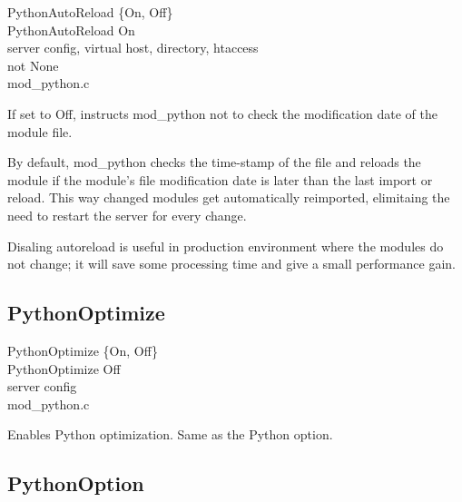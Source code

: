 PythonAutoReload \{On, Off\} \\
PythonAutoReload On\\
server config, virtual host, directory, htaccess\\
not None\\
mod_python.c

If set to Off, instructs mod_python not to check the modification date
of the module file. 

By default, mod_python checks the time-stamp of the file and reloads
the module if the module's file modification date is later than the
last import or reload. This way changed modules get automatically
reimported, elimitaing the need to restart the server for every
change.

Disaling autoreload is useful in production environment where the
modules do not change; it will save some processing time and give a
small performance gain.

\subsection{PythonOptimize\label{dir-other-pomz}}

PythonOptimize \{On, Off\} \\
PythonOptimize Off\\
server config\\
mod_python.c

Enables Python optimization. Same as the Python  option.

\subsection{PythonOption\label{dir-other-po}}

